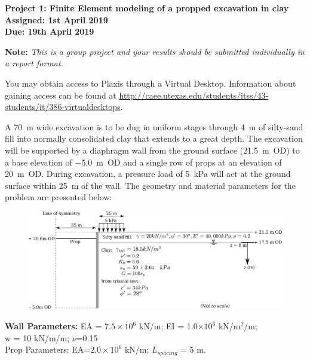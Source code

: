 \documentclass[a4paper,12pt]{article}
\begin{document}
\begin{centering}
	\textbf{
		Project 1: Finite Element modeling of a propped excavation in clay\\
		Assigned: 1st April 2019\\
		Due: 19th April 2019\\
	}
\end{centering}

\vspace{1em}

\textbf{Note: }\textit{This is a group project and your results should be submitted 
	individually in a report format.}

You may obtain access to Plaxis through a Virtual Desktop.  Information about gaining access can be found at \url{ http://caee.utexas.edu/students/itss/43-students/it/386-virtualdesktops}.  

A \SI{70}{\meter} wide excavation is to be dug in uniform stages through 
\SI{4}{\meter} of silty-sand fill into normally consolidated clay that 
extends to a great depth. The excavation will be supported by a diaphragm wall 
from the ground surface (\SI{+21.5}{\meter}~OD) to a base elevation of 
\SI{-5.0}{\meter}~OD and a single row of props at an elevation of 
\SI{+20}{\meter}~OD.  During excavation, a pressure 
load of \SI{5}{\kilo\pascal} will act at the ground surface within 
\SI{25}{\meter} of the wall.  The geometry and material parameters for the 
problem are presented below:

\begin{figure}[h]
	\includegraphics[width=\textwidth]{Problem.pdf}
\end{figure}

\begin{center}
	\textbf{Wall Parameters:} EA = $7.5\times 10^6$ kN/m; EI = 1.0$\times10^6$ 
	kN/m$^2$/m; \\ w = 10 kN/m/m; $\nu$=0.15 \\
	Prop Parameters: EA=$2.0\times10^6$ kN/m; $L_{spacing}$ = 5 m.
\end{center}
\end{document}
